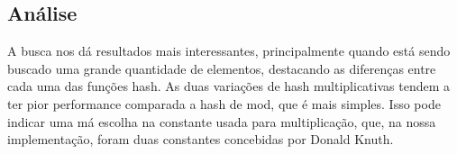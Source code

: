 \documentclass[12pt]{article}
\begin{document}
\newpage
\subsection{Análise}
A busca nos dá resultados mais interessantes, principalmente quando está sendo buscado uma grande quantidade de elementos, destacando as diferenças entre cada uma das funções hash.
As duas variações de hash multiplicativas tendem a ter pior performance comparada a hash de mod, que é mais simples. Isso pode indicar uma má escolha na constante usada para multiplicação,
que, na nossa implementação, foram duas constantes concebidas por Donald Knuth.
\end{document}
